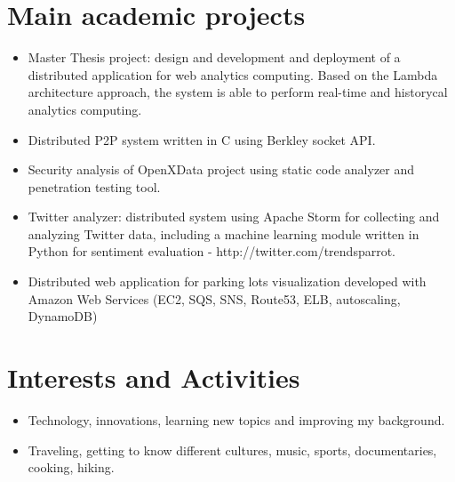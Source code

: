 \documentclass[a4paper,10pt]{article} %
\begin{document}
\section{Main academic projects}
\begin{itemize}
\item Master Thesis project: design and development and deployment of a distributed application for web analytics computing. Based on the Lambda architecture approach, the system is able to perform real-time and historycal analytics computing. 
\item Distributed P2P system written in C using Berkley socket API.
\item Security analysis of OpenXData project using static code analyzer and penetration testing tool.
\item Twitter analyzer: distributed system using Apache Storm for collecting and analyzing Twitter data, including a machine learning module written in Python for sentiment evaluation - http://twitter.com/trendsparrot.
\item Distributed web application for parking lots visualization developed with Amazon Web Services (EC2, SQS, SNS, Route53, ELB, autoscaling, DynamoDB)
\end{itemize}




\section{Interests and Activities}
\vspace{2mm}
\begin{itemize}
\item Technology, innovations, learning  new topics and improving my background.
\item Traveling, getting to know different cultures, music, sports, documentaries, cooking, hiking.
\end{itemize}

\end{document}
